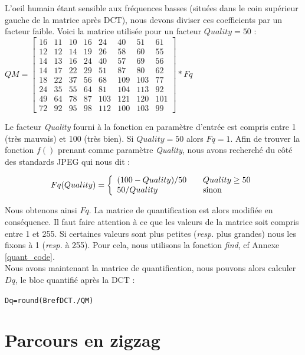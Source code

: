\documentclass[a4paper, 12pt]{article}
\begin{document}
L'oeil humain étant sensible aux fréquences basses (situées dans le coin supérieur gauche de la matrice après DCT), nous devons diviser ces coefficients par un facteur faible. Voici la matrice utilisée pour un facteur $\textit{Quality} = 50$ :  \\

$QM = \begin{bmatrix}
	16 & 11 & 10 & 16 & 24  & 40  & 51  & 61  \\
	12 & 12 & 14 & 19 & 26  & 58  & 60  & 55  \\
	14 & 13 & 16 & 24 & 40  & 57  & 69  & 56  \\
	14 & 17 & 22 & 29 & 51  & 87  & 80  & 62  \\
	18 & 22 & 37 & 56 & 68  & 109 & 103 & 77  \\
	24 & 35 & 55 & 64 & 81  & 104 & 113 & 92  \\
	49 & 64 & 78 & 87 & 103 & 121 & 120 & 101 \\
	72 & 92 & 95 & 98 & 112 & 100 & 103 & 99
\end{bmatrix} * Fq$


Le facteur \textit{Quality} fourni à la fonction en paramètre d’entrée est compris entre 1 (très mauvais) et 100
(très bien). Si $Quality = 50$ alors $Fq = 1$. Afin de trouver la fonction $f()$ prenant comme paramètre \textit{Quality}, nous avons recherché du côté des standards JPEG qui nous dit :


\[ Fq(Quality) = \left\{ 
  \begin{array}{l l}
    (100 - Quality)/50 & \quad \text{$Quality \geq 50$}\\
    50/Quality & \quad \text{sinon}
  \end{array} \right.\]

Nous obtenons ainsi $Fq$. La matrice de quantification est alors modifiée en conséquence. Il faut faire attention à ce que les valeurs de la matrice soit compris entre 1 et 255. Si certaines valeurs sont plus petites (\textit{resp.} plus grandes) nous les fixons à 1 (\textit{resp.} à 255). Pour cela, nous utilisons la fonction \textit{find}, cf Annexe \ref{quant_code}.\\

Nous avons maintenant la matrice de quantification, nous pouvons alors calculer $Dq$, le bloc quantifié après la DCT : 
\begin{alltt}
Dq = round(BrefDCT./QM)
\end{alltt}


\section{Parcours en zigzag}
\end{document}
